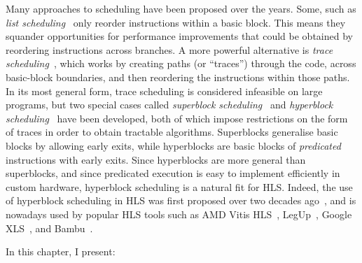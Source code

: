 \noindent Many approaches to scheduling have been proposed over the years. Some,
such as \emph{list scheduling}~\cite[][p.257]{baker19_princ} only reorder
instructions within a basic block. This means they squander opportunities for
performance improvements that could be obtained by reordering instructions
across branches. A more powerful alternative is \emph{trace
  scheduling}~\cite{ellis85_bulld, fisher81_trace_sched}, which works by
creating paths (or \enquote{traces}) through the code, across basic-block
boundaries, and then reordering the instructions within those paths. In its most
general form, trace scheduling is considered infeasible on large programs, but
two special cases called \emph{superblock scheduling}~\cite{hwu93_super} and
\emph{hyperblock
  scheduling}~\cite{mahlke92_effec_compil_suppor_predic_execut_using_hyper} have
been developed, both of which impose restrictions on the form of traces in order
to obtain tractable algorithms. Superblocks generalise basic blocks by allowing
early exits, while hyperblocks are basic blocks of \emph{predicated}
instructions with early exits. Since hyperblocks are more general than
superblocks, and since predicated execution is easy to implement efficiently in
custom hardware, hyperblock scheduling is a natural fit for HLS. Indeed, the use
of hyperblock scheduling in HLS was first proposed over two decades
ago~\cite{budiu02_compil_applic_specif_hardw,
  callahan98_instr_level_paral_recon_comput}, and is nowadays used by popular
HLS tools such as AMD Vitis HLS~\cite{amd23_vitis_forum},
LegUp~\cite[][p.60]{canis15_legup}, Google XLS~\cite[line~112]{google23_xls},
and Bambu~\cite[line~304]{ferrandi14_panda_bambu}.


In this chapter, I present:

